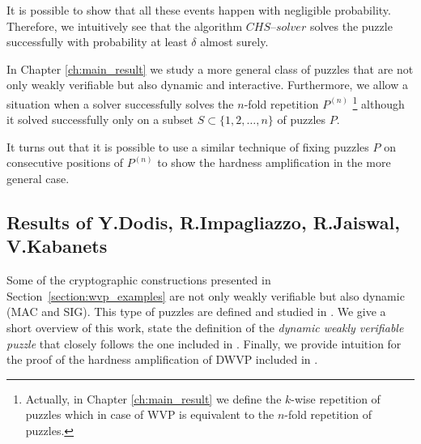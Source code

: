 It is possible to show that all these events happen with negligible probability.
Therefore, we intuitively see that the algorithm $\mathit{CHS\text{--}solver}$
solves the puzzle successfully with probability at least $\delta$ almost surely.

In Chapter \ref{ch:main_result} we study a more general class of puzzles that are not only weakly verifiable but also dynamic and interactive.
Furthermore, we allow a situation when a solver successfully solves the $n$-fold repetition $P^{(n)}$
\footnote{Actually, in Chapter \ref{ch:main_result} we define the $k$-wise repetition of puzzles
which in case of WVP is equivalent to the $n$-fold repetition of puzzles.}
although it solved successfully only on a subset $S \subset \{1,2,\dotsc, n\}$ of puzzles $P$.

It turns out that it is possible to use a similar technique of fixing puzzles $P$ on consecutive positions of $P^{(n)}$ to
show the hardness amplification in the more general case.
%
\subsection{Results of Y.Dodis, R.Impagliazzo, R.Jaiswal, V.Kabanets}
\label{subsec:dijk}
Some of the cryptographic constructions presented in Section~\ref{section:wvp_examples}
are not only weakly verifiable but also dynamic (MAC and SIG). This type of puzzles are defined and studied in \cite{Dodis:2009:SAI:1530441.1530450}.
We give a short overview of this work, state the definition of the \textit{dynamic weakly verifiable puzzle} that closely follows
the one included in \cite{Dodis:2009:SAI:1530441.1530450}.
Finally, we provide intuition for the proof of the hardness amplification of DWVP
included in \cite{Dodis:2009:SAI:1530441.1530450}.

